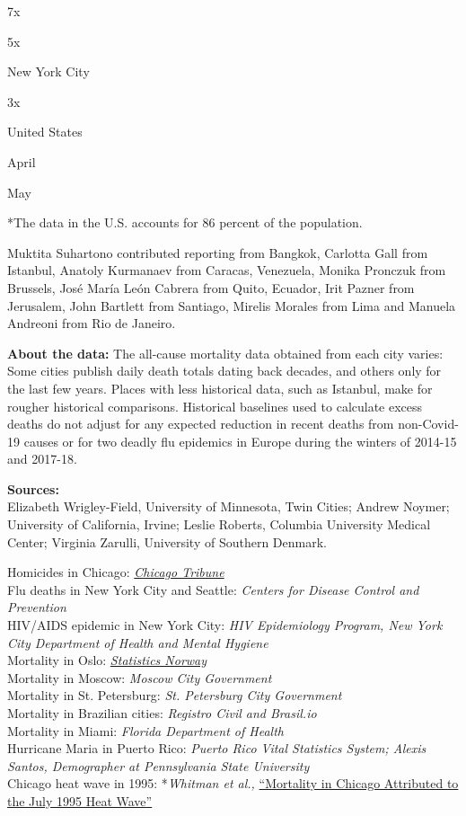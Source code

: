 7x

5x

New York City

3x

United States

April

May

*The data in the U.S. accounts for 86 percent of the population.

Muktita Suhartono contributed reporting from Bangkok, Carlotta Gall from
Istanbul, Anatoly Kurmanaev from Caracas, Venezuela, Monika Pronczuk
from Brussels, José María León Cabrera from Quito, Ecuador, Irit Pazner
from Jerusalem, John Bartlett from Santiago, Mirelis Morales from Lima
and Manuela Andreoni from Rio de Janeiro.

\textbf{About the data:} The all-cause mortality data obtained from each
city varies: Some cities publish daily death totals dating back decades,
and others only for the last few years. Places with less historical
data, such as Istanbul, make for rougher historical comparisons.
Historical baselines used to calculate excess deaths do not adjust for
any expected reduction in recent deaths from non-Covid-19 causes or for
two deadly flu epidemics in Europe during the winters of 2014-15 and
2017-18.

\textbf{Sources:}\\
Elizabeth Wrigley-Field, University of Minnesota, Twin Cities; Andrew
Noymer; University of California, Irvine; Leslie Roberts, Columbia
University Medical Center; Virginia Zarulli, University of Southern
Denmark.

Homicides in Chicago:
\emph{\href{https://www.chicagotribune.com/data/ct-shooting-victims-map-charts-htmlstory.html}{Chicago
Tribune}}\\
Flu deaths in New York City and Seattle: \emph{Centers for Disease
Control and Prevention}\\
HIV/AIDS epidemic in New York City: \emph{HIV Epidemiology Program, New
York City Department of Health and Mental Hygiene}\\
Mortality in Oslo:
\emph{\href{https://www.ssb.no/en/statbank/table/12973/}{Statistics
Norway}}\\
Mortality in Moscow: \emph{Moscow City Government}\\
Mortality in St. Petersburg: \emph{St. Petersburg City Government}\\
Mortality in Brazilian cities: \emph{Registro Civil and Brasil.io}\\
Mortality in Miami: \emph{Florida Department of Health}\\
Hurricane Maria in Puerto Rico: \emph{Puerto Rico Vital Statistics
System; Alexis Santos, Demographer at Pennsylvania State University}\\
Chicago heat wave in 1995: *\emph{Whitman et al.,}
\href{https://ajph.aphapublications.org/doi/pdf/10.2105/AJPH.87.9.1515}{``Mortality
in Chicago Attributed to the July 1995 Heat Wave''}

